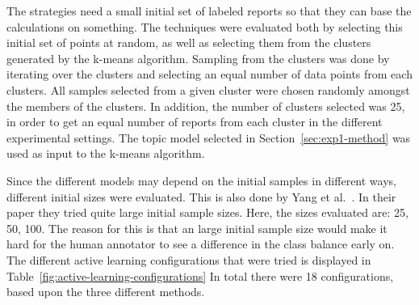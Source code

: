 The strategies need a small initial set of labeled reports so that they can base the calculations on something.
The techniques were evaluated both by selecting this initial set of points at random, as well as selecting them from the clusters generated by the k-means algorithm.
Sampling from the clusters was done by iterating over the clusters and selecting an equal number of data points from each clusters.
All samples selected from a given cluster were chosen randomly amongst the members of the clusters.
In addition, the number of clusters selected was 25, in order to get an equal number of reports from each cluster in the different experimental settings.
The topic model selected in Section~\ref{sec:exp1-method} was used as input to the k-means algorithm.

Since the different models may depend on the initial samples in different ways, different initial sizes were evaluated.
This is also done by Yang et al\@.~\cite{yang2009effective}.
In their paper they tried quite large initial sample sizes.
Here, the sizes evaluated are: 25, 50, 100.
The reason for this is that an large initial sample size would make it hard for the human annotator to see a difference in the class balance early on.
The different active learning configurations that were tried is displayed in Table~\ref{fig:active-learning-configurations}
In total there were 18 configurations, based upon the three different methods.

